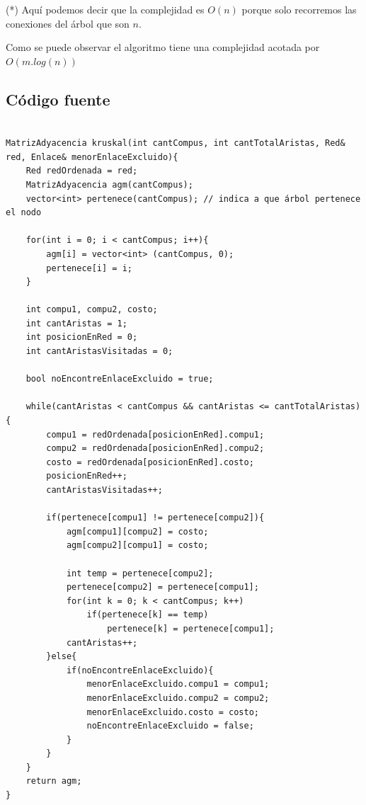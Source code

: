 (*) Aquí podemos decir que la complejidad es $O(n)$ porque solo recorremos las conexiones del árbol que son $n$.

Como se puede observar el algoritmo tiene una complejidad acotada por $O(m.log(n))$


\newpage


\subsection{C\'odigo fuente}

\begin{lstlisting}

MatrizAdyacencia kruskal(int cantCompus, int cantTotalAristas, Red& red, Enlace& menorEnlaceExcluido){
    Red redOrdenada = red;
    MatrizAdyacencia agm(cantCompus);
    vector<int> pertenece(cantCompus); // indica a que árbol pertenece el nodo
 
    for(int i = 0; i < cantCompus; i++){
        agm[i] = vector<int> (cantCompus, 0);
        pertenece[i] = i;
    }
 
    int compu1, compu2, costo;
    int cantAristas = 1;
    int posicionEnRed = 0;
    int cantAristasVisitadas = 0;

    bool noEncontreEnlaceExcluido = true;

    while(cantAristas < cantCompus && cantAristas <= cantTotalAristas){
        compu1 = redOrdenada[posicionEnRed].compu1;
        compu2 = redOrdenada[posicionEnRed].compu2;
        costo = redOrdenada[posicionEnRed].costo;
        posicionEnRed++;
        cantAristasVisitadas++;

        if(pertenece[compu1] != pertenece[compu2]){
            agm[compu1][compu2] = costo;
            agm[compu2][compu1] = costo;
 
        	int temp = pertenece[compu2];
        	pertenece[compu2] = pertenece[compu1];
        	for(int k = 0; k < cantCompus; k++)
        		if(pertenece[k] == temp)
        			pertenece[k] = pertenece[compu1]; 
            cantAristas++;
        }else{
            if(noEncontreEnlaceExcluido){
                menorEnlaceExcluido.compu1 = compu1;
                menorEnlaceExcluido.compu2 = compu2;
                menorEnlaceExcluido.costo = costo;
                noEncontreEnlaceExcluido = false;
            }
        }
    }
    return agm;
}





\end{lstlisting}


